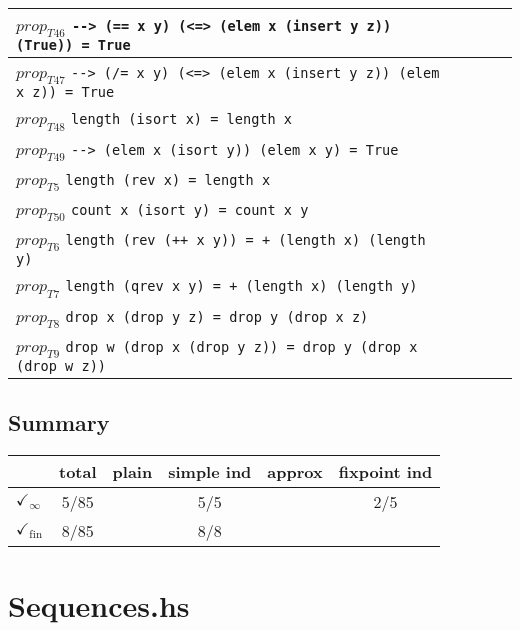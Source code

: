 \documentclass{article}
\begin{document}
\begin{longtable}{p{10cm} || c | c | c | c | }
\hline
$prop_{T46}$ \newline \verb`--> (== x y) (<=> (elem x (insert y z)) (True)) = True` &  &  &  &  \\
\hline
$prop_{T47}$ \newline \verb`--> (/= x y) (<=> (elem x (insert y z)) (elem x z)) = True` &  &  &  &  \\
\hline
$prop_{T48}$ \newline \verb`length (isort x) = length x` &  &  &  &  \\
\hline
$prop_{T49}$ \newline \verb`--> (elem x (isort y)) (elem x y) = True` &  &  &  &  \\
\hline
$prop_{T5}$ \newline \verb`length (rev x) = length x` &  &  &  &  \\
\hline
$prop_{T50}$ \newline \verb`count x (isort y) = count x y` &  &  &  &  \\
\hline
$prop_{T6}$ \newline \verb`length (rev (++ x y)) = + (length x) (length y)` &  &  &  &  \\
\hline
$prop_{T7}$ \newline \verb`length (qrev x y) = + (length x) (length y)` &  &  &  &  \\
\hline
$prop_{T8}$ \newline \verb`drop x (drop y z) = drop y (drop x z)` &  &  &  &  \\
\hline
$prop_{T9}$ \newline \verb`drop w (drop x (drop y z)) = drop y (drop x (drop w z))` &  &  &  &  \\
\end{longtable}

\subsection*{Summary}
\begin{longtable}{p{4cm} || c | c | c | c | c | }
  & total & plain & simple ind & approx & fixpoint ind \\
\hline
$\checkmark_{\infty}$ & 5/85 &  & 5/5 &  & 2/5\\
\hline
$\checkmark_{\mathrm{fin}}$ & 8/85 &  & 8/8 &  & \\
\end{longtable}

\section*{Sequences.hs}
\end{document}
